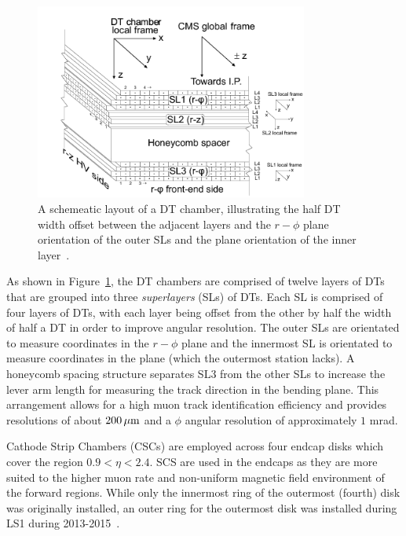 \begin{figure}[htb]
\begin{center}
\includegraphics[width=0.8\textwidth]{figs/cms/DTchamber.png}
\caption{A schemeatic layout of a DT chamber, illustrating the half DT width offset between the adjacent layers and the $r-\phi$ plane orientation of the outer SLs and the \rz plane orientation of the inner layer~\cite{Chatrchyan:2009hg}.}
\label{fig:dtSuperLayers}
\end{center}
\end{figure}

As shown in Figure~\ref{fig:dtSuperLayers}, the DT chambers are comprised of twelve layers of DTs that are grouped into three \emph{superlayers} (SLs) of DTs.
Each SL is comprised of four layers of DTs, with each layer being offset from the other by half the width of half a DT in order to improve angular resolution.
The outer SLs are orientated to measure coordinates in the $r-\phi$ plane and the innermost SL is orientated to measure coordinates in the \rz plane (which the outermost station lacks).
A honeycomb spacing structure separates SL3 from the other SLs to increase the lever arm length for measuring the track direction in the bending plane.
This arrangement allows for a high muon track identification efficiency and provides resolutions of about $200\,\mu\text{m}$ and a $\phi$ angular resolution of approximately $1$ mrad.

Cathode Strip Chambers (CSCs) are employed across four endcap disks which cover the region $0.9 < \eta < 2.4$.
SCS are used in the endcaps as they are more suited to the higher muon rate and non-uniform magnetic field environment of the forward regions.
While only the innermost ring of the outermost (fourth) disk was originally installed, an outer ring for the outermost disk was installed during LS1 during 2013-2015~\cite{Battilana:2017mrm}.

